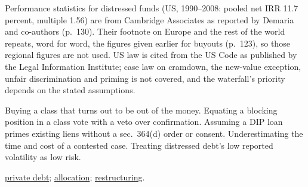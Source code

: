 \begin{qfmethod}
 Performance statistics for distressed funds (US, 1990--2008: pooled net IRR 11.7 percent, multiple 1.56) are from Cambridge Associates as reported by Demaria and co-authors (p.~130). Their footnote on Europe and the rest of the world repeats, word for word, the figures given earlier for buyouts (p.~123), so those regional figures are not used. US law is cited from the US Code as published by the Legal Information Institute; case law on cramdown, the new-value exception, unfair discrimination and priming is not covered, and the waterfall's priority depends on the stated assumptions.

 Buying a class that turns out to be out of the money. Equating a blocking position in a class vote with a veto over confirmation. Assuming a DIP loan primes existing liens without a sec.~364(d) order or consent. Underestimating the time and cost of a contested case. Treating distressed debt's low reported volatility as low risk.

 \hyperref[def:private-debt-features]{private debt}; \hyperref[meth:private-capital-allocation]{allocation}; \hyperref[meth:restructuring-evaluation]{restructuring}.

\end{qfmethod}
